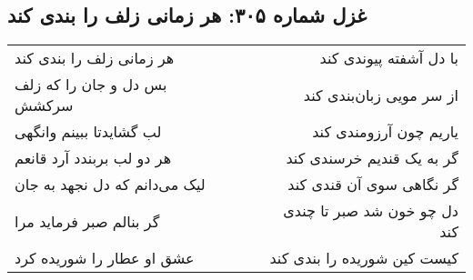 \begin{center}
\section*{غزل شماره ۳۰۵: هر زمانی زلف را بندی کند}
\label{sec:305}
\begin{longtable}{l p{0.5cm} r}
هر زمانی زلف را بندی کند
&&
با دل آشفته پیوندی کند
\\
بس دل و جان را که زلف سرکشش
&&
از سر مویی زبان‌بندی کند
\\
لب گشایدتا ببینم وانگهی
&&
یاریم چون آرزومندی کند
\\
هر دو لب بربندد آرد قانعم
&&
گر به یک قندیم خرسندی کند
\\
لیک می‌دانم که دل نجهد به جان
&&
گر نگاهی سوی آن قندی کند
\\
گر بنالم صبر فرماید مرا
&&
دل چو خون شد صبر تا چندی کند
\\
عشق او عطار را شوریده کرد
&&
کیست کین شوریده را بندی کند
\\
\end{longtable}
\end{center}
